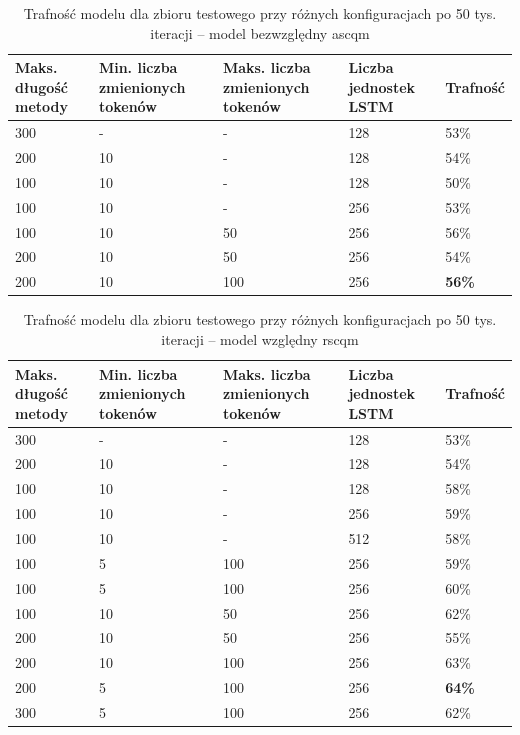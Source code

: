 \documentclass[twoside]{praca}
\begin{document}
\begin{table}[H]
\centering
\caption{Trafność modelu dla zbioru testowego przy różnych konfiguracjach po 50 tys. iteracji -- model bezwzględny \gls{ascqm}}
\label{tbl:learn:results-map-wz}
\begin{tabular}{|p{}|p{}|p{}|p{}|p{}|}
  \hline 
   \textbf{Maks. długość metody} & \textbf{Min. liczba zmienionych tokenów} & \textbf{Maks. liczba zmienionych tokenów} & \textbf{Liczba jednostek LSTM} & \textbf{Trafność} \\ \hline 
  300 & - & - & 128 & 53\% \\ \hline 
  200 & 10 & - & 128 & 54\% \\ \hline
  100 & 10 & - & 128 & 50\% \\ \hline
  100 & 10 & - & 256 & 53\% \\ \hline
  100 & 10 & 50 & 256 & 56\% \\ \hline
  200 & 10 & 50 & 256 & 54\% \\ \hline
  200 & 10 & 100 & 256 & \textbf{56\%} \\ \hline
\end{tabular} 
\end{table}

\begin{table}[h]
\centering
\caption{Trafność modelu dla zbioru testowego przy różnych konfiguracjach po 50 tys. iteracji -- model względny \gls{rscqm}}
\label{tbl:learn:results-map-bz}
\begin{tabular}{|p{}|p{}|p{}|p{}|p{}|}
  \hline 
  \textbf{Maks. długość metody} & \textbf{Min. liczba zmienionych tokenów} & \textbf{Maks. liczba zmienionych tokenów} & \textbf{Liczba jednostek LSTM} & \textbf{Trafność} \\ \hline 
  300 & - & - & 128 & 53\% \\ \hline 
  200 & 10 & - & 128 & 54\% \\ \hline
  100 & 10 & - & 128 & 58\% \\ \hline
  100 & 10 & - & 256 & 59\% \\ \hline
  100 & 10 & - & 512 & 58\% \\ \hline
  100 & 5 & 100 & 256 & 59\% \\ \hline
  100 & 5 & 100 & 256 & 60\% \\ \hline
  100 & 10 & 50 & 256 & 62\% \\ \hline
  200 & 10 & 50 & 256 & 55\% \\ \hline
  200 & 10 & 100 & 256 & 63\% \\ \hline
  200 & 5 & 100 & 256 & \textbf{64\%} \\ \hline
  300 & 5 & 100 & 256 & 62\% \\ \hline
\end{tabular} 
\end{table}
\end{document}
